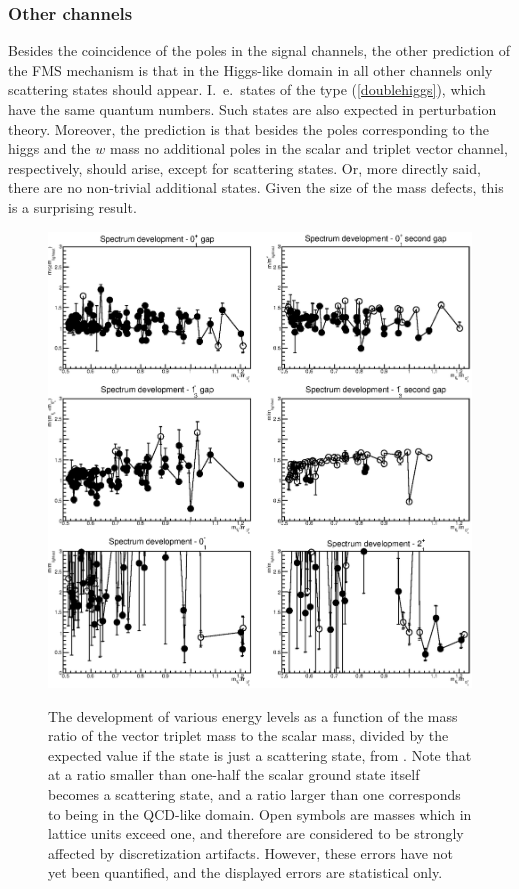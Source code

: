 \documentclass[final,12pt,3p,longtitle]{elsarticle}
\newcommand*{\pref}[1]{(\ref{#1})}
\newcommand*{\1}{1\!\!\!\bot}
\begin{document}
\subsubsection{Other channels}\label{sss:other}

Besides the coincidence of the poles in the signal channels, the other prediction of the FMS mechanism is that in the Higgs-like domain in all other channels only scattering states should appear. I.\ e.\ states of the type \pref{doublehiggs}, which have the same quantum numbers. Such states are also expected in perturbation theory. Moreover, the prediction is that besides the poles corresponding to the higgs and the $w$ mass no additional poles in the scalar and triplet vector channel, respectively, should arise, except for scattering states. Or, more directly said, there are no non-trivial additional states. Given the size of the mass defects, this is a surprising result.

\begin{figure}
\includegraphics[width=\linewidth]{spectrum}\\
\caption{\label{fig:spectrum}The development of various energy levels as a function of the mass ratio of the vector triplet mass to the scalar mass, divided by the expected value if the state is just a scattering state, from \cite{Maas:2014pba,Maas:unpublished}. Note that at a ratio smaller than one-half the scalar ground state itself becomes a scattering state, and a ratio larger than one corresponds to being in the QCD-like domain. Open symbols are masses which in lattice units exceed one, and therefore are considered to be strongly affected by discretization artifacts. However, these errors have not yet been quantified, and the displayed errors are statistical only.}
\end{figure}
\end{document}
